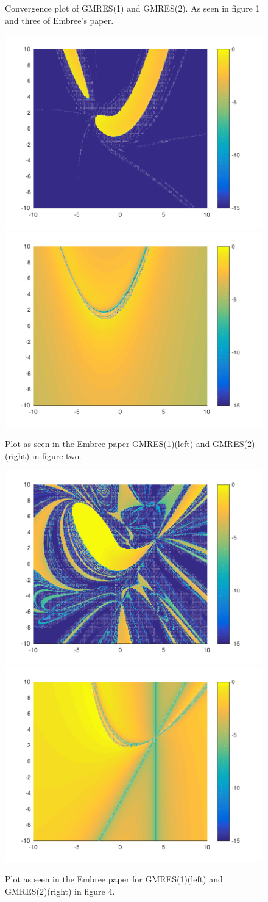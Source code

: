 \begin{figure}


\caption{Convergence plot of GMRES(1) and GMRES(2). As seen in figure 1 and three of Embree's paper.}
\label{fig:ConvergenceFig1AndFig3}
\end{figure}

\begin{figure}
\centering
\includegraphics[width=0.45\linewidth]{../src/figure/fig2Matp1}
\includegraphics[width=0.45\linewidth]{../src/figure/fig2Matp2}
\caption{Plot as seen in the Embree paper GMRES(1)(left) and GMRES(2)(right) in figure two.}
\label{fig:fig2}
\end{figure}

\begin{figure}
\centering
\includegraphics[width=0.45\linewidth]{../src/figure/fig4Matp2}
\includegraphics[width=0.45\linewidth]{../src/figure/fig4Matp1}
\caption{Plot as seen in the Embree paper for GMRES(1)(left) and GMRES(2)(right) in figure 4.}
\label{fig:fig4}
\end{figure}

